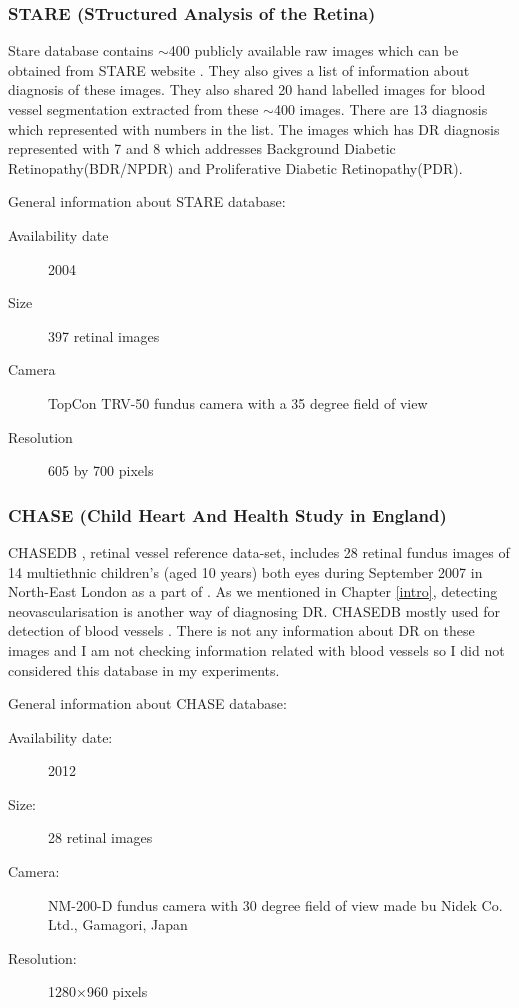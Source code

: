 \subsubsection{STARE (STructured Analysis of the Retina)}
Stare database contains $\sim$400 publicly available raw images which can be obtained from STARE website \citep{STARE}. They also gives a list of information about diagnosis of these images. They also shared 20 hand labelled images for blood vessel segmentation \citep{hoover2000locating} extracted from these $\sim$400 images. There are 13 diagnosis which represented with numbers in the list. The images which has DR diagnosis represented with 7 and 8 which addresses Background Diabetic Retinopathy(BDR/NPDR) and Proliferative Diabetic Retinopathy(PDR).

General information about STARE database:

\begin{description}
    \item[Availability date] 2004
    \item[Size] 397 retinal images
    \item[Camera] TopCon TRV-50 fundus camera with a 35 degree field of view
    \item[Resolution] 605 by 700 pixels
\end{description}

\subsubsection{CHASE (Child Heart And Health Study in England)}

CHASEDB \citep{Retinal-image-database}, retinal vessel reference data-set, includes 28 retinal fundus images of 14 multiethnic children's (aged 10 years) both eyes during September 2007 in North-East London as a part of \citet{fraz2012ensemble}. As we mentioned in Chapter \ref{intro}, detecting neovascularisation is another way of diagnosing DR. CHASEDB mostly used for detection of blood vessels \citep{liskowski2016segmenting, elbalaoui2016automatic}. There is not any information about DR on these images and I am not checking information related with blood vessels so I did not considered this database in my experiments.

General information about CHASE database:
\begin{description}
    \item[Availability date:] 2012
    \item[Size:] 28 retinal images
    \item[Camera:] NM-200-D fundus camera with 30 degree field of view made bu Nidek Co. Ltd., Gamagori, Japan
    \item[Resolution:] 1280$\times$960 pixels
\end{description}

